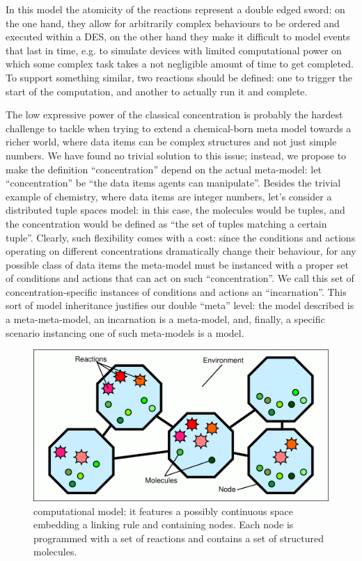 \documentclass[12pt,a4paper,twoside,openright]{book}
\begin{document}
In this model the atomicity of the reactions represent a double edged sword: on the one hand, they allow for arbitrarily complex behaviours to be ordered and executed within a DES, on the other hand they make it difficult to model events that last in time, e.g. to simulate devices with limited computational power on which some complex task takes a not negligible amount of time to get completed.
%
To support something similar, two reactions should be defined: one to trigger the start of the computation, and another to actually run it and complete.

The low expressive power of the classical concentration is probably the hardest challenge to tackle when trying to extend a chemical-born meta model towards a richer world, where data items can be complex structures and not just simple numbers.
%
We have found no trivial solution to this issue; instead, we propose to make the definition ``concentration'' depend on the actual meta-model: let ``concentration'' be ``the data items agents can manipulate''.
%
Besides the trivial example of chemistry, where data items are integer numbers, let's consider a distributed tuple spaces model: in this case, the molecules would be tuples, and the concentration would be defined as ``the set of tuples matching a certain tuple''.
%
Clearly, such flexibility comes with a cost: since the conditions and actions operating on different concentrations dramatically change their behaviour, for any possible class of data items the meta-model must be instanced with a proper set of conditions and actions that can act on such ``concentration''.
%
We call this set of concentration-specific instances of conditions and actions an ``incarnation''.
%
This sort of model inheritance justifies our double ``meta'' level: the model described is a meta-meta-model, an incarnation is a meta-model, and, finally, a specific scenario instancing one of such meta-models is a model.

\label{model}
\begin{figure}%
  \begin{center}
    \includegraphics[width=0.99\columnwidth]{img/model.pdf}
    \caption[\alchemist{} computational model]{\alchemist{} computational model: it features a possibly continuous space embedding a linking rule and containing nodes. Each node is programmed with a set of reactions and contains a set of structured molecules.}
    \label{img:model}
  \end{center}
\end{figure}
\end{document}
